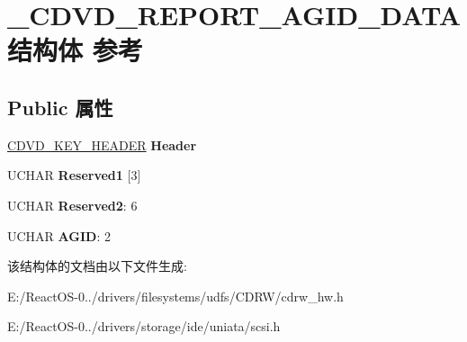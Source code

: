\hypertarget{struct___c_d_v_d___r_e_p_o_r_t___a_g_i_d___d_a_t_a}{}\section{\+\_\+\+C\+D\+V\+D\+\_\+\+R\+E\+P\+O\+R\+T\+\_\+\+A\+G\+I\+D\+\_\+\+D\+A\+T\+A结构体 参考}
\label{struct___c_d_v_d___r_e_p_o_r_t___a_g_i_d___d_a_t_a}
\subsection*{Public 属性}
\begin{DoxyCompactItemize}
\item 
\mbox{\label{struct___c_d_v_d___r_e_p_o_r_t___a_g_i_d___d_a_t_a_aa041c2f32b35eb7765178ccf5bb347d3}} 
\hyperlink{struct___c_d_v_d___k_e_y___h_e_a_d_e_r}{C\+D\+V\+D\+\_\+\+K\+E\+Y\+\_\+\+H\+E\+A\+D\+ER} {\bfseries Header}
\item 
\mbox{\label{struct___c_d_v_d___r_e_p_o_r_t___a_g_i_d___d_a_t_a_ad3fdb4625416e4b0d76904e4e14c3acd}} 
U\+C\+H\+AR {\bfseries Reserved1} \mbox{[}3\mbox{]}
\item 
\mbox{\label{struct___c_d_v_d___r_e_p_o_r_t___a_g_i_d___d_a_t_a_a74e3f53c753a920f26e42ff268ceb5e5}} 
U\+C\+H\+AR {\bfseries Reserved2}\+: 6
\item 
\mbox{\label{struct___c_d_v_d___r_e_p_o_r_t___a_g_i_d___d_a_t_a_a420be231447158e6d934879563f9c6f2}} 
U\+C\+H\+AR {\bfseries A\+G\+ID}\+: 2
\end{DoxyCompactItemize}


该结构体的文档由以下文件生成\+:\begin{DoxyCompactItemize}
\item 
E\+:/\+React\+O\+S-\/0../drivers/filesystems/udfs/\+C\+D\+R\+W/cdrw\+\_\+hw.\+h\item 
E\+:/\+React\+O\+S-\/0../drivers/storage/ide/uniata/scsi.\+h\end{DoxyCompactItemize}
